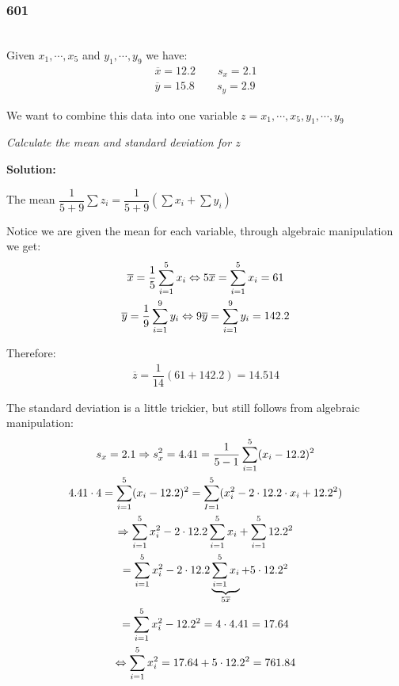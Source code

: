 \subsubsection{601}\hfill\\
\noindent Given $x_1,\cdots,x_5$ and $y_1,\cdots, y_9$ we have:
\begin{equation*}
  \begin{gathered}
    \overline{x} = 12.2\qquad s_x = 2.1\\
    \overline{y} = 15.8\qquad s_y = 2.9
  \end{gathered}
\end{equation*}\par
\noindent We want to combine this data into one variable $z = x_1,\cdots,x_5,y_1,\cdots,y_9$
\par\bigskip
\noindent\textit{Calculate the mean and standard deviation for $z$}
\par\bigskip
\noindent\textbf{Solution:}\par
\noindent The mean $\dfrac{1}{5+9}\sum z_i = \dfrac{1}{5+9}\left(\sum x_i + \sum y_i\right)$\par
\noindent Notice we are given the mean for each variable, through algebraic manipulation we get:
\begin{equation*}
  \begin{gathered}
    \overline{x} = \dfrac{1}{5}\sum_{i=1}^{5}x_i\Leftrightarrow 5\overline{x} = \sum_{i=1}^{5}x_i = 61\\
    \overline{y} = \dfrac{1}{9}\sum_{i=1}^{9}y_i\Leftrightarrow 9\overline{y} = \sum_{i=1}^{9}y_i = 142.2
  \end{gathered}
\end{equation*}\par
\noindent Therefore:
\begin{equation*}
  \begin{gathered}
    \overline{z} = \dfrac{1}{14}(61+142.2) = 14.514
  \end{gathered}
\end{equation*}
\par\bigskip
\noindent The standard deviation is a little trickier, but still follows from algebraic manipulation:
\begin{equation*}
  \begin{gathered}
    s_x = 2.1 \Rightarrow s_x^2 = 4.41 = \dfrac{1}{5-1}\sum_{i=1}^{5}(x_i-12.2)^2\\
    4.41\cdot4 = \sum_{i=1}^{5}(x_i-12.2)^2 = \sum_{I=1}^{5}(x_i^2-2\cdot12.2\cdot x_i + 12.2^2)\\
    \Rightarrow \sum_{i=1}^{5}x_i^2-2\cdot12.2\sum_{i=1}^{5}x_i+\sum_{i=1}^{5}12.2^2\\
    =\sum_{i=1}^{5}x_i^2-2\cdot12.2\underbrace{\sum_{i=1}^{5}x_i}_{\text{$5\overline{x}$}}+5\cdot12.2^2\\
    =\sum_{i=1}^{5}x_i^2-12.2^2 = 4\cdot4.41 = 17.64\\
    \Leftrightarrow \sum_{i=1}^{5}x_i^2 = 17.64+5\cdot12.2^2 = 761.84
  \end{gathered}
\end{equation*}\par
